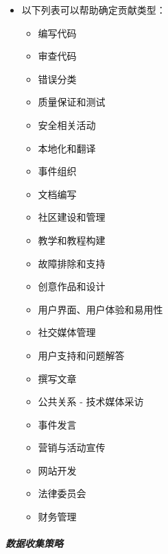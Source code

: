 \begin{itemize}
\tightlist
\item
  以下列表可以帮助确定贡献类型：

  \begin{itemize}
  \tightlist
  \item
    编写代码
  \item
    审查代码
  \item
    错误分类
  \item
    质量保证和测试
  \item
    安全相关活动
  \item
    本地化和翻译
  \item
    事件组织
  \item
    文档编写
  \item
    社区建设和管理
  \item
    教学和教程构建
  \item
    故障排除和支持
  \item
    创意作品和设计
  \item
    用户界面、用户体验和易用性
  \item
    社交媒体管理
  \item
    用户支持和问题解答
  \item
    撰写文章
  \item
    公共关系 - 技术媒体采访
  \item
    事件发言
  \item
    营销与活动宣传
  \item
    网站开发
  \item
    法律委员会
  \item
    财务管理
  \end{itemize}
\end{itemize}

\hypertarget{ux6570ux636eux6536ux96c6ux7b56ux7565}{%
\subparagraph{数据收集策略}\label{ux6570ux636eux6536ux96c6ux7b56ux7565}}

